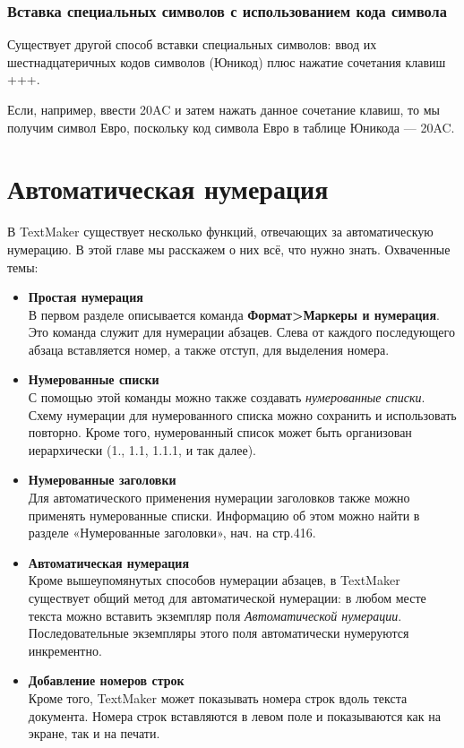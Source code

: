 \documentclass[a4paper,10pt]{article}
\begin{document}
\subsubsection{Вставка специальных символов с использованием кода символа}
Существует другой способ вставки специальных символов: ввод их шестнадцатеричных кодов символов (Юникод) плюс нажатие сочетания клавиш +++.

Если, например, ввести 20AC и затем нажать данное сочетание клавиш, то мы получим символ Евро, поскольку код символа Евро в таблице Юникода --- 20AC.

\section{Автоматическая нумерация}

В TextMaker существует несколько функций, отвечающих за автоматическую нумерацию. В этой главе мы расскажем о них всё, что нужно знать. Охваченные темы:

\begin{itemize}
 \item \textbf{Простая нумерация}\\
 В первом разделе описывается команда \textbf{Формат>Маркеры и нумерация}. Это команда служит для нумерации абзацев. Слева от каждого последующего абзаца вставляется номер, а также отступ, для выделения номера.
 \item \textbf{Нумерованные списки}\\
 С помощью этой команды можно также создавать \textit{нумерованные списки}. Схему нумерации для нумерованного списка можно сохранить и использовать повторно. Кроме того, нумерованный список может быть организован иерархически (1., 1.1, 1.1.1, и так далее).
 \item \textbf{Нумерованные заголовки}\\
 Для автоматического применения нумерации заголовков также можно применять нумерованные списки. Информацию об этом можно найти в разделе «Нумерованные заголовки», нач. на стр.416.
 \item \textbf{Автоматическая нумерация}\\
 Кроме вышеупомянутых способов нумерации абзацев, в TextMaker существует общий метод для автоматической нумерации: в любом месте текста можно вставить экземпляр поля \textit{Автоматической нумерации}. Последовательные экземпляры этого поля автоматически нумеруются инкрементно.
 \item \textbf{Добавление номеров строк}\\
 Кроме того, TextMaker может показывать номера строк вдоль текста документа. Номера строк вставляются в левом поле и показываются как на экране, так и на печати.
\end{itemize}  
\end{document}
